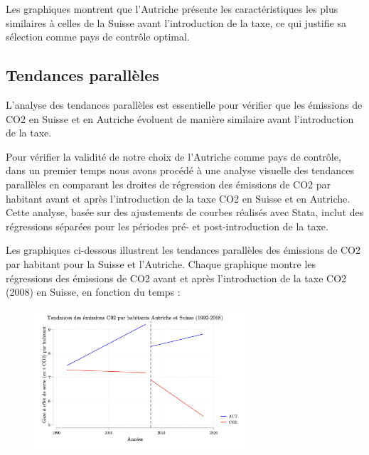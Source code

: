 Les graphiques montrent que l'Autriche présente les caractéristiques les plus similaires à celles de la Suisse avant l'introduction de la taxe, ce qui justifie sa sélection comme pays de contrôle optimal.

\subsection{Tendances parallèles}
\label{subsec:pt}

L'analyse des tendances parallèles est essentielle pour vérifier que les émissions de CO2 en Suisse et en Autriche évoluent de manière similaire avant l'introduction de la taxe.

Pour vérifier la validité de notre choix de l'Autriche comme pays de contrôle, dans un premier temps nous avons procédé à une analyse visuelle des tendances parallèles en comparant les droites de régression des émissions de CO2 par habitant avant et après l'introduction de la taxe CO2 en Suisse et en Autriche. Cette analyse, basée sur des ajustements de courbes réalisés avec Stata, inclut des régressions séparées pour les périodes pré- et post-introduction de la taxe.

Les graphiques ci-dessous illustrent les tendances parallèles des émissions de CO2 par habitant pour la Suisse et l'Autriche. Chaque graphique montre les régressions des émissions de CO2 avant et après l'introduction de la taxe CO2 (2008) en Suisse, en fonction du temps :



\begin{figure}[H]
\centering
\includegraphics[width=0.7\textwidth]{Article/images/ptrend.png}
\caption{}
\label{fig:ptrend}
\end{figure}


